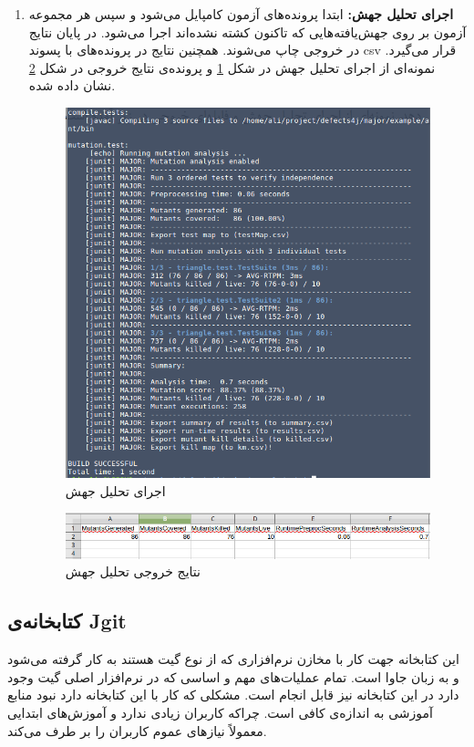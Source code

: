 \begin{enumerate}
\item
\textbf{ اجرای تحلیل جهش:}
 ابتدا پرونده‌های آزمون کامپایل می‌شود و سپس هر مجموعه آزمون بر روی جهش‌یافته‌هایی که تاکنون کشته نشده‌اند اجرا می‌شود. در پایان نتایج  در خروجی چاپ می‌شوند. همچنین نتایج  در پرونده‌های با پسوند csv قرار می‌گیرد. نمونه‌ای از اجرای تحلیل جهش در شکل \ref{fig:major-analysis} و پرونده‌ی نتایج خروجی در شکل \ref{fig:major-results} نشان داده شده.
 
 \begin{figure}[H]
 	\centering
 	\includegraphics[width=.8\textwidth]{img/case_study/major-analysis.png}
 	\caption{اجرای تحلیل جهش}
 	\label{fig:major-analysis}
 \end{figure}
 
 \begin{figure}[H]
 	\centering
 	\includegraphics[width=.8\textwidth]{img/case_study/major-results.png}
 	\caption{نتایج خروجی تحلیل جهش}
 	\label{fig:major-results}
 \end{figure}

\end{enumerate}


\subsection{کتابخانه‌ی Jgit}
این کتابخانه جهت کار با مخازن نرم‌افزاری  که از نوع گیت هستند به کار گرفته می‌شود و به زبان جاوا است. تمام عملیات‌های مهم و اساسی که در نرم‌افزار اصلی گیت وجود دارد در این کتابخانه نیز قابل انجام است. مشکلی که کار با این کتابخانه دارد نبود منابع آموزشی به اندازه‌ی کافی است. چراکه کاربران زیادی ندارد و آموزش‌های ابتدایی معمولاً نیازهای عموم کاربران را بر طرف می‌کند. 
